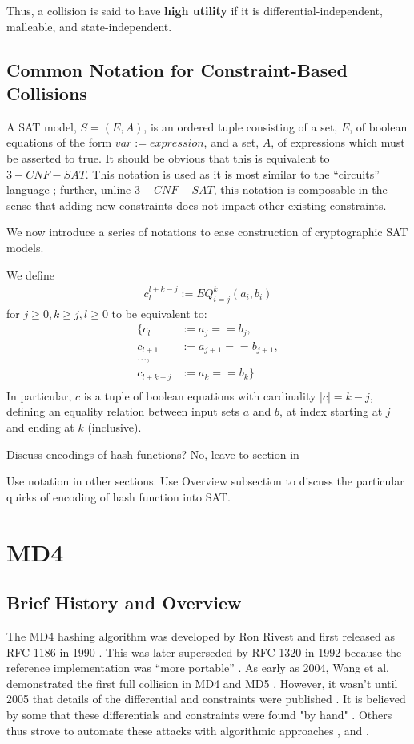 \documentclass[letterpaper,twocolumn,10pt]{article}
\begin{document}
Thus, a collision is said to have \textbf{high utility} if it is
differential-independent, malleable, and state-independent.

\subsection{Common Notation for Constraint-Based Collisions}
A SAT model, $S = (E, A)$, is an ordered tuple consisting of a set, $E$, of
boolean equations of the form $var := expression$, and a set, $A$, of expressions
which must be asserted to true. It should be obvious that this is equivalent
to $3-CNF-SAT$. This notation is used as it is most similar to the ``circuits''
language \cite{circuits}; further, unline $3-CNF-SAT$, this notation is composable
in the sense that adding new constraints does not impact other existing constraints.

We now introduce a series of notations to ease construction of cryptographic
SAT models.

We define
\begin{align*}
    c_{l}^{l + k - j} := EQ_{i = j}^{k}(a_i, b_i)
\end{align*}
for $j \geq 0, k \geq j, l \geq 0$ to be equivalent to:
\begin{align*}
    \{ c_l & := a_j == b_j, \\
    c_{l+1} & := a_{j+1} == b_{j+1}, \\
    ..., \\
    c_{l+k-j} & := a_{k} == b_{k} \} \\
\end{align*}
In particular, $c$ is a tuple of boolean equations with cardinality $|c| = k-j$,
defining an equality relation between input sets $a$ and $b$, at index starting
at $j$ and ending at $k$ (inclusive).

Discuss encodings of hash functions? No, leave to section in

Use notation in other sections. Use Overview subsection to discuss
the particular quirks of encoding of hash function into SAT.

\section{MD4}
\subsection{Brief History and Overview}

The MD4 hashing algorithm was developed by Ron Rivest and first released as RFC 1186
in 1990 \cite{rfc1186}. This was later superseded by RFC 1320 in 1992 because the
reference implementation was ``more portable'' \cite{rfc1320}. As early as 2004,
Wang et al, demonstrated the first full collision in MD4 and MD5 \cite{cryptoeprint:2004:199}.
However, it wasn't until 2005 that details of the differential and constraints
were published \cite{Wang2005}. It is believed by some that these differentials
and constraints were found "by hand" \cite{cryptoeprint:2007:206}. Others thus
strove to automate these attacks with algorithmic approaches \cite{Schlaffer2006}
\cite{cryptoeprint:2007:206}, and \cite{Sasaki2007}.
\end{document}
